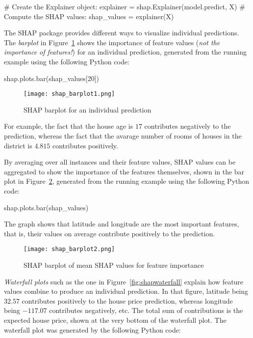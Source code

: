 \begin{samepage}
\begin{pythoncode}
# Create the Explainer object:
explainer = shap.Explainer(model.predict, X)
# Compute the SHAP values:
shap_values = explainer(X)
\end{pythoncode}
\end{samepage}


The SHAP package provides different ways to visualize individual predictions. The \emph{barplot} in Figure~\ref{fig:shapbar1} shows the importance of feature values (\emph{not the importance of features!}) for an individual prediction, generated from the running example using the following Python code:

\begin{pythoncode}
shap.plots.bar(shap_values[20])
\end{pythoncode}

\begin{figure}
\centering

\texttt{[image: shap\_barplot1.png]}
\caption{SHAP barplot for an individual prediction}
\label{fig:shapbar1}
\end{figure}

For example, the fact that the house age is $17$ contributes negatively to the prediction, whereas the fact that the avarage number of rooms of houses in the district is $4.815$ contributes positively.

By averaging over all instances and their feature values, SHAP values can be aggregated to show the importance of the features themselves, shown in the bar plot in Figure~\ref{fig:shapbar2}, generated from the running example using the following Python code:

\begin{pythoncode}
shap.plots.bar(shap_values)
\end{pythoncode}

The graph shows that latitude and longitude are the most important features, that is, their values on average contribute positively to the prediction. 

\begin{figure}
\centering

\texttt{[image: shap\_barplot2.png]}
\caption{SHAP barplot of mean SHAP values for feature importance}
\label{fig:shapbar2}
\end{figure}

\emph{Waterfall plots} such as the one in Figure~\ref{fig:shapwaterfall} explain how feature values combine to produce an individual prediction. In that figure, latitude being $32.57$ contributes positively to the house price prediction, whereas longitude being $-117.07$ contributes negatively, etc. The total sum of contributions is the expected house price, shown at the very bottom of the waterfall plot. The waterfall plot was generated by the following Python code:
 
